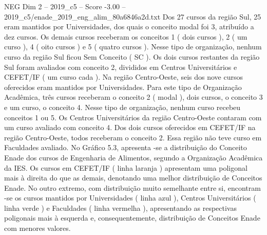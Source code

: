 \begin{textsample}{NEG Dim 2 – 2019\_c5 – Score -3.00 – 2019\_c5/enade\_2019\_eng\_alim\_80a6846a2d.txt}
Dos 27 cursos da região Sul, 25 eram mantidos por Universidades, dos quais o conceito modal foi 3, atribuído a dez cursos.
Os demais cursos receberam os conceitos 1 ( dois cursos ), 2 ( um curso ), 4 ( oito cursos ) e 5 ( quatro cursos ).
Nesse tipo de organização, nenhum curso da região Sul ficou Sem Conceito ( SC ).
Os dois cursos restantes da região Sul foram avaliados com conceito 2, divididos em Centros Universitários e CEFET/IF ( um curso cada ).
Na região Centro-Oeste, seis dos nove cursos oferecidos eram mantidos por Universidades.
Para este tipo de Organização Acadêmica, três cursos receberam o conceito 2 ( modal ), dois cursos, o conceito 3 e um curso, o conceito 4.
Nesse tipo de organização, nenhum curso recebeu conceitos 1 ou 5.
Os Centros Universitários da região Centro-Oeste contaram com um curso avaliado com conceito 4.
Dos dois cursos oferecidos em CEFET/IF na região Centro-Oeste, todos receberam o conceito 2.
Essa região não teve curso em Faculdades avaliado.
No Gráfico 5.3, apresenta -se a distribuição do Conceito Enade dos cursos de Engenharia de Alimentos, segundo a Organização Acadêmica da IES.
Os cursos em CEFET/IF ( linha laranja ) apresentam uma poligonal mais à direita do que as demais, denotando uma melhor distribuição de Conceitos Enade.
No outro extremo, com distribuição muito semelhante entre si, encontram -se os cursos mantidos por Universidades ( linha azul ), Centros Universitários ( linha verde ) e Faculdades ( linha vermelha ), apresentando as respectivas poligonais mais à esquerda e, consequentemente, distribuição de Conceitos Enade com menores valores.

\end{textsample}
